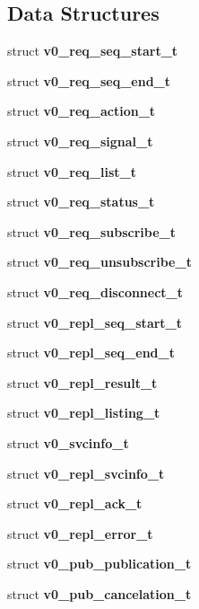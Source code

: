 \subsection*{Data Structures}
\begin{DoxyCompactItemize}
\item 
struct {\bf v0\_\-req\_\-seq\_\-start\_\-t}
\item 
struct {\bf v0\_\-req\_\-seq\_\-end\_\-t}
\item 
struct {\bf v0\_\-req\_\-action\_\-t}
\item 
struct {\bf v0\_\-req\_\-signal\_\-t}
\item 
struct {\bf v0\_\-req\_\-list\_\-t}
\item 
struct {\bf v0\_\-req\_\-status\_\-t}
\item 
struct {\bf v0\_\-req\_\-subscribe\_\-t}
\item 
struct {\bf v0\_\-req\_\-unsubscribe\_\-t}
\item 
struct {\bf v0\_\-req\_\-disconnect\_\-t}
\item 
struct {\bf v0\_\-repl\_\-seq\_\-start\_\-t}
\item 
struct {\bf v0\_\-repl\_\-seq\_\-end\_\-t}
\item 
struct {\bf v0\_\-repl\_\-result\_\-t}
\item 
struct {\bf v0\_\-repl\_\-listing\_\-t}
\item 
struct {\bf v0\_\-svcinfo\_\-t}
\item 
struct {\bf v0\_\-repl\_\-svcinfo\_\-t}
\item 
struct {\bf v0\_\-repl\_\-ack\_\-t}
\item 
struct {\bf v0\_\-repl\_\-error\_\-t}
\item 
struct {\bf v0\_\-pub\_\-publication\_\-t}
\item 
struct {\bf v0\_\-pub\_\-cancelation\_\-t}
\end{DoxyCompactItemize}
